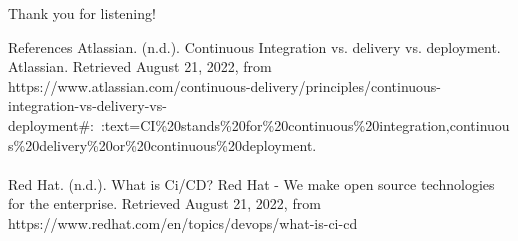 \documentclass{beamer}
\begin{document}

\begin{frame}
\Huge{\centerline{Thank you for listening!}}
\end{frame}

\begin{frame}{References}
	Atlassian. (n.d.). Continuous Integration vs. delivery vs. deployment. Atlassian. Retrieved August 21, 2022, from https://www.atlassian.com/continuous-delivery/principles/continuous-integration-vs-delivery-vs-deployment#:~:text=CI\%20stands\%20for\%20continuous\%20integration,continuous\%20delivery\%20or\%20continuous\%20deployment. 
	\\~\\
	Red Hat. (n.d.). What is Ci/CD? Red Hat - We make open source technologies for the enterprise. Retrieved August 21, 2022, from https://www.redhat.com/en/topics/devops/what-is-ci-cd 
\end{frame}
\end{document}
